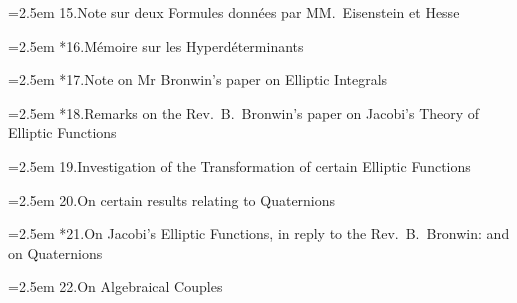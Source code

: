 \documentclass[11pt]{article}
\begin{document}
\noindent\hangindent=2.5em
15.\quad Note sur deux Formules donn\'ees par MM.\ Eisenstein et Hesse\par
\hspace{1.5em}{\small Crelle, t.~xxix.\ (1845), pp.~54--57}\par

\noindent\hangindent=2.5em
*16.\quad M\'emoire sur les Hyperd\'eterminants\par
\hspace{1.5em}{\small Crelle, t.~xxx.\ (1846), pp.~1--37}\par

\noindent\hangindent=2.5em
*17.\quad Note on Mr Bronwin's paper on Elliptic Integrals\par
\hspace{1.5em}{\small Camb.\ Math.\ Jour.\ t.~iii.\ (1843), pp.~197, 198}\par

\noindent\hangindent=2.5em
*18.\quad Remarks on the Rev.\ B.\ Bronwin's paper on Jacobi's Theory of Elliptic Functions\par
\hspace{1.5em}{\small Phil.\ Mag.\ t.~xxii.\ (1843), pp.~358--368}\par

\noindent\hangindent=2.5em
19.\quad Investigation of the Transformation of certain Elliptic Functions\par
\hspace{1.5em}{\small Phil.\ Mag.\ t.~xxv.\ (1844), pp.~352--354}\par

\noindent\hangindent=2.5em
20.\quad On certain results relating to Quaternions\par
\hspace{1.5em}{\small Phil.\ Mag.\ t.~xxvi.\ (1845), pp.~141--145}\par

\noindent\hangindent=2.5em
*21.\quad On Jacobi's Elliptic Functions, in reply to the Rev.\ B.\ Bronwin: and on Quaternions\par
\hspace{1.5em}{\small Phil.\ Mag.\ t.~xxvi.\ (1845), pp.~208--211}\par

\noindent\hangindent=2.5em
22.\quad On Algebraical Couples\par
\hspace{1.5em}{\small Phil.\ Mag.\ t.~xxvii.\ (1845), pp.~38--40}\par
\end{document}
